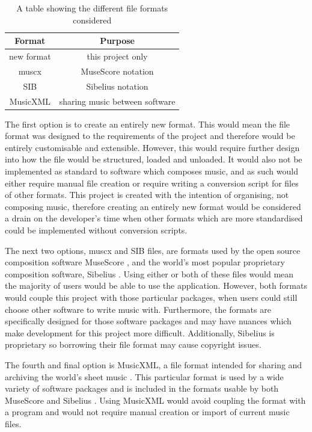 \begin{table}[H]
\centering
\begin{tabular}{| c | c | } \hline
  {\textbf{Format}} & {\textbf{Purpose}} \\ \hline
  new format & this project only \\ \hline
  muscx & MuseScore notation \\ \hline
  SIB & Sibelius notation \\ \hline
  MusicXML & sharing music between software \\ \hline
\end{tabular}
\caption{A table showing the different file formats considered}
\label{table:formats}
\end{table}
The first option is to create an entirely new format. This would mean the file format was designed to the requirements of the project and therefore would be entirely customisable and extensible. However, this would require further design into how the file would be structured, loaded and unloaded.
 It would also not be implemented as standard to software which composes music, and as such would either require manual file creation or require writing a conversion script for files of other formats. This project is created with the intention of organising, not composing music, therefore creating an entirely new format would be considered a drain on the developer's time when other formats which are more standardised could be implemented without conversion scripts.

The next two options, muscx and SIB files, are formats used by the open source composition software MuseScore \parencite{MuseTour}, and the world's most popular proprietary composition software, Sibelius \parencite{avid}. Using either or both of these files would mean the majority of users would be able to use the application. 
However, both formats would couple this project with those particular packages, when users could still choose other software to write music with. Furthermore, the formats are specifically designed for those software packages and may have nuances which make development for this project more difficult. Additionally, Sibelius is proprietary so borrowing their file format may cause copyright issues.


The fourth and final option is MusicXML, a file format intended for sharing and archiving the world's sheet music \parencite{mxml}. This particular format is used by a wide variety of software packages \parencite{mxml} and is included in the formats usable by both MuseScore \parencite{MuseTour} and Sibelius \parencite{avid}. Using MusicXML would avoid coupling the format with a program and would not require manual creation or import of current music files. 

